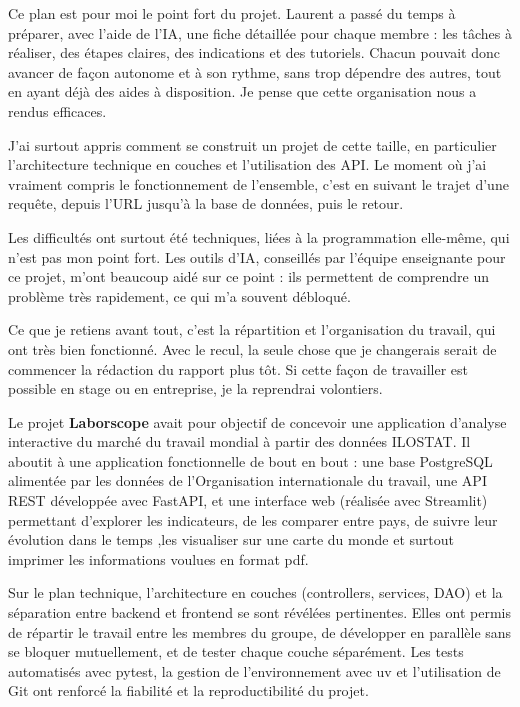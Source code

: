 \documentclass[
  french,
  12pt,
  letterpaper,
  DIV=11,
  numbers=noendperiod]{scrartcl}
\newcommand{\mychapterstar}[1]{%
  \addcontentsline{toc}{chapter}{#1}%
  \vspace{4pt}%
  \noindent{\Large\bfseries\color{MainColor}\MakeUppercase{#1}}\par
  \vspace{4pt}\par%
}
\begin{document}
Ce plan est pour moi le point fort du projet. Laurent a passé du temps à
préparer, avec l'aide de l'IA, une fiche détaillée pour chaque membre :
les tâches à réaliser, des étapes claires, des indications et des
tutoriels. Chacun pouvait donc avancer de façon autonome et à son
rythme, sans trop dépendre des autres, tout en ayant déjà des aides à
disposition. Je pense que cette organisation nous a rendus efficaces.

J'ai surtout appris comment se construit un projet de cette taille, en
particulier l'architecture technique en couches et l'utilisation des
API. Le moment où j'ai vraiment compris le fonctionnement de l'ensemble,
c'est en suivant le trajet d'une requête, depuis l'URL jusqu'à la base
de données, puis le retour.

Les difficultés ont surtout été techniques, liées à la programmation
elle-même, qui n'est pas mon point fort. Les outils d'IA, conseillés par
l'équipe enseignante pour ce projet, m'ont beaucoup aidé sur ce point :
ils permettent de comprendre un problème très rapidement, ce qui m'a
souvent débloqué.

Ce que je retiens avant tout, c'est la répartition et l'organisation du
travail, qui ont très bien fonctionné. Avec le recul, la seule chose que
je changerais serait de commencer la rédaction du rapport plus tôt. Si
cette façon de travailler est possible en stage ou en entreprise, je la
reprendrai volontiers.

\newpage

\mychapterstar{CONCLUSION}

Le projet \textbf{Laborscope} avait pour objectif de concevoir une
application d'analyse interactive du marché du travail mondial à partir
des données ILOSTAT. Il aboutit à une application fonctionnelle de bout
en bout : une base PostgreSQL alimentée par les données de
l'Organisation internationale du travail, une API REST développée avec
FastAPI, et une interface web (réalisée avec Streamlit) permettant
d'explorer les indicateurs, de les comparer entre pays, de suivre leur
évolution dans le temps ,les visualiser sur une carte du monde et
surtout imprimer les informations voulues en format pdf.

Sur le plan technique, l'architecture en couches (controllers, services,
DAO) et la séparation entre backend et frontend se sont révélées
pertinentes. Elles ont permis de répartir le travail entre les membres
du groupe, de développer en parallèle sans se bloquer mutuellement, et
de tester chaque couche séparément. Les tests automatisés avec pytest,
la gestion de l'environnement avec uv et l'utilisation de Git ont
renforcé la fiabilité et la reproductibilité du projet.
\end{document}
